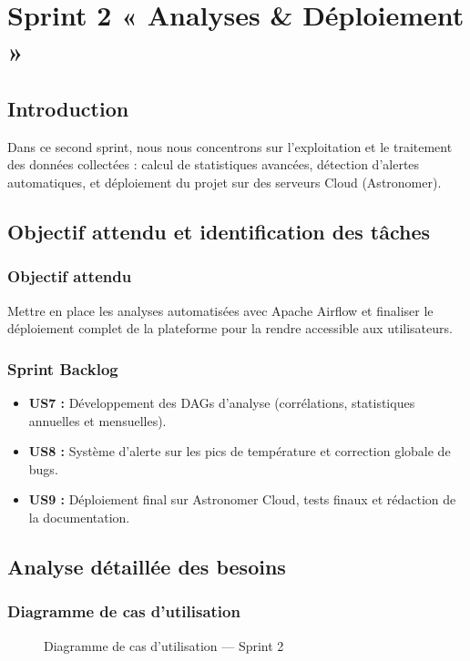 \chapter{Sprint 2 « Analyses \& Déploiement »}

\section{Introduction}
Dans ce second sprint, nous nous concentrons sur l'exploitation et le traitement des données collectées : calcul de statistiques avancées, détection d'alertes automatiques, et déploiement du projet sur des serveurs Cloud (Astronomer).

\section{Objectif attendu et identification des tâches}

\subsection{Objectif attendu}
Mettre en place les analyses automatisées avec Apache Airflow et finaliser le déploiement complet de la plateforme pour la rendre accessible aux utilisateurs.

\subsection{Sprint Backlog}
\begin{itemize}
    \item \textbf{US7 :} Développement des DAGs d'analyse (corrélations, statistiques annuelles et mensuelles).
    \item \textbf{US8 :} Système d'alerte sur les pics de température et correction globale de bugs.
    \item \textbf{US9 :} Déploiement final sur Astronomer Cloud, tests finaux et rédaction de la documentation.
\end{itemize}

\section{Analyse détaillée des besoins}

\subsection{Diagramme de cas d'utilisation}
\begin{figure}[H]
\centering
{}
\caption{Diagramme de cas d'utilisation — Sprint 2}
\end{figure}

